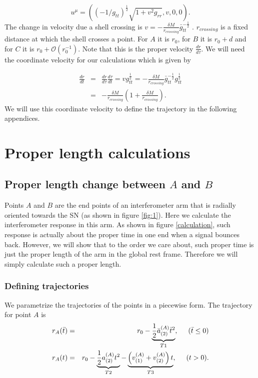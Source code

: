 \documentclass[aps,showpacs,onecolumn,floats,prd,superscriptaddress,nofootinbib]{revtex4-1}
\begin{document}
\begin{equation}
	u^\mu = \left( (-1/g_{tt})^\frac{1}{2} \sqrt{1+v^2g_{rr} }, v , 0, 0 \right).	\label{5}
\end{equation}
The change in velocity due a shell crossing is $v = -\frac{\delta M}{r_{crossing}} \bar{g}_{tt}^{-\frac{1}{2}} $ . $r_{crossing}$ is a fixed distance at which the shell crosses a point. For $A$ it is $r_0$, for $B$ it is $r_0 + d$ and for $C$ it is $r_0 + \mathcal{O}(r_0^{-1})$. Note that this is the proper velocity $\frac{dr}{d\tau}$. We will need the coordinate velocity for our calculations which is given by 

\begin{eqnarray}
	\frac{dr}{dt} &=& \frac{dr}{d \tau} \frac{d \tau}{dt} = v g_{tt}^{\frac{1}{2}} = - \frac{\delta M}{r_{crossing}} \bar{g}_{tt}^{-\frac{1}{2}} g_{tt}^\frac{1}{2} \nonumber \\
	&=& -\frac{\delta M}{r_{crossing}} \left( 1 + \frac{\delta M}{r_{crossing}} \right).
\end{eqnarray}
We will use this coordinate velocity to define the trajectory in the following appendices. 


\section{Proper length calculations}
\subsection{Proper length change between $A$ and $B$}
\label{sec-LAB}

Points $A$ and $B$ are the end points of an interferometer arm that is radially oriented towards the SN (as shown in figure \ref{fig:1}). 
Here we calculate the interferometer response in this arm.
As shown in figure \ref{calculation}, such response is actually about the proper time in one end when a signal bounces back.
However, we will show that to the order we care about, such proper time is just the proper length of the arm in the global rest frame.
Therefore we will simply calculate such a proper length.

\subsubsection{Defining trajectories}

We parametrize the trajectories of the points in a piecewise form. 
The trajectory for point $A$ is
\begin{eqnarray}
	r_A(\bar{t}) & = & r_0 - \underbrace{\frac{1}{2} \bar{a}_{(2)}^{(A)} \bar{t}^2}_{T1}, \hspace{5mm} (\bar{t} \leq 0)	\nonumber	\\
	r_A(t) & = & r_0 - \underbrace{\frac{1}{2} a^{(A)}_{(2)} t^2}_{T2} - \underbrace{\left(v^{(A)}_{(1)} + v^{(A)}_{(2)} \right)t}_{T3},  \hspace{5mm} (t>0)  \label{rA}.
\end{eqnarray}
\end{document}
